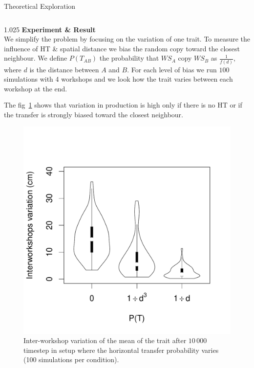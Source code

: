 \documentclass[final]{beamer}
\newlength{\onecolwid}
\newlength{\twocolwid}
\begin{document}
\begin{frame}[t]
\begin{columns}[t]
\begin{column}{\twocolwid}
\begin{block}{Theoretical Exploration}
\begin{columns}[t,totalwidth=\twocolwid]
\begin{column}{1.025\onecolwid} %
{\textbf{Experiment \& Result}}\\
\justify
We simplify the problem by focusing on the variation of one trait. To measure the influence of HT \& spatial distance we bias the random copy toward the closest neighbour. We define $P(T_{AB})$ the probability that $WS_A$ copy $WS_B$ as $\frac{1}{f(d)}$, where $d$ is the distance between $A$ and $B$.
For each level of bias we run $100$ simulations with 4 workshops and we look how the trait varies between each workshop at the end.

The fig~\ref{fig:resmod} shows that variation in production is high only if there is no HT or if the transfer is strongly biased toward the closest neighbour.
\vspace{-1cm}

    \begin{figure}[h!]
    \centering
%	    
	\includegraphics[width=0.5\linewidth]{images/interworkshopvar.pdf}
\singlespace
\vspace{-.8cm}
\caption{Inter-workshop variation of the mean of the trait after $10\,000$ timestep in setup where the horizontal transfer probability varies (100 simulations per condition).}
	\label{fig:resmod}
    \end{figure}
\vspace{-1cm}




\end{column}
\end{columns}
\end{block}
\end{column}
\end{columns}
\end{frame}
\end{document}
